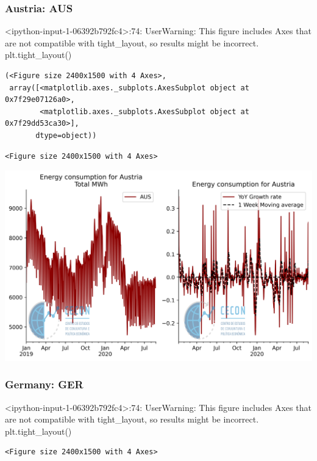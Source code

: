 \documentclass[11pt]{article}
\begin{document}
\subsubsection{Austria: AUS}
\label{sec:orgec8e7e1}

<ipython-input-1-06392b792fc4>:74: UserWarning: This figure includes Axes that are not compatible with tight\_layout, so results might be incorrect.
  plt.tight\_layout()

\begin{verbatim}
(<Figure size 2400x1500 with 4 Axes>,
 array([<matplotlib.axes._subplots.AxesSubplot object at 0x7f29e07126a0>,
        <matplotlib.axes._subplots.AxesSubplot object at 0x7f29dd53ca30>],
       dtype=object))
\end{verbatim}


\begin{verbatim}
<Figure size 2400x1500 with 4 Axes>
\end{verbatim}


\begin{center}
\includegraphics[width=.9\linewidth]{obipy-resources/62e383af79e91b63c7fc98dd7fb55b3c3ececcb9/9ef112a5872cc34e81a6bb8ef5d1a8c7b5fddf8e.png}
\end{center}

\subsubsection{Germany: GER}
\label{sec:org34d5574}

<ipython-input-1-06392b792fc4>:74: UserWarning: This figure includes Axes that are not compatible with tight\_layout, so results might be incorrect.
  plt.tight\_layout()

\begin{verbatim}
<Figure size 2400x1500 with 4 Axes>
\end{verbatim}
\end{document}
